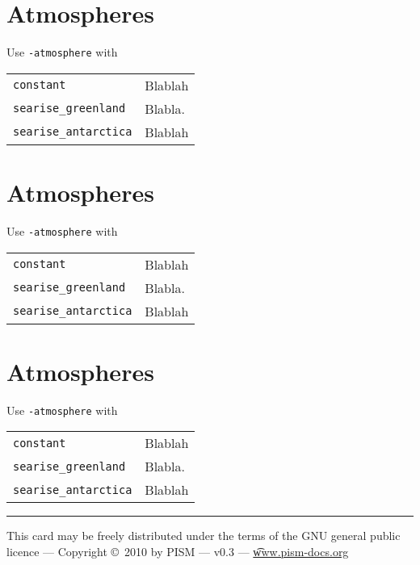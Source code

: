 \documentclass[landscape]{article}
\begin{document}
\begin{multicols}{3}
\section{Atmospheres}
Use \verb|-atmosphere| with
 
\begin{tabular}{@{}ll@{}}
\verb|constant|    & Blablah \\
\verb|searise_greenland|  & Blabla. \\
\verb|searise_antarctica|  & Blablah
\end{tabular}

\section{Atmospheres}
Use \verb|-atmosphere| with
 
\begin{tabular}{@{}ll@{}}
\verb|constant|    & Blablah \\
\verb|searise_greenland|  & Blabla. \\
\verb|searise_antarctica|  & Blablah
\end{tabular}

\section{Atmospheres}
Use \verb|-atmosphere| with
 
\begin{tabular}{@{}ll@{}}
\verb|constant|    & Blablah \\
\verb|searise_greenland|  & Blabla. \\
\verb|searise_antarctica|  & Blablah
\end{tabular}



\end{multicols}

\rule{0.3\linewidth}{0.25pt}
\scriptsize

This card may be freely distributed under the terms of the GNU general
public licence --- Copyright \copyright\ 2010 by PISM --- v0.3 --- \href{http://www.pism-docs.org}{\t{www.pism-docs.org}}
\end{document}
